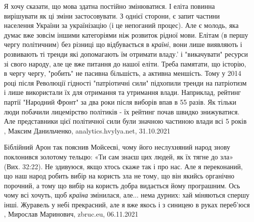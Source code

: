 Я хочу сказати, що мова здатна постійно змінюватися. І еліта повинна вирішувати
як ці зміни застосовувати. З однієї сторони, є запит частини населення України
за українізацію (і це непоганий процес). Але є молодь, яка думає вже зовсім
іншими категоріями ніж розвиток рідної мови. Елітам (в першу чергу політичним)
без різниці що відбувається в \emph{країні}, вони лише виявляють і розвивають ті
тренди які допомагають їм отримати владу.' і "викачувати" ресурси зі свого
народу, але це вже питання до нашої еліти. Треба памятати, що історію, в чергу
чергу, "робить" не пасивна більшість, а активна меншість. Тому у 2014 році
після Революції гідності "патріотичні сили" підхопили тренди на патріотизм і
лише використали їх для отримання та утримання влади. Наприклад, рейтинг партії
"Народний Фронт" за два роки після виборів впав в 55 разів. Як тільки люди
побачили лицемірство політиків - їх рейтинг почав швидко знижуватися. Але
представники цієї політичної сили були значною частиною влади всі 5 років
, 
Максим Данильченко, analytics.hvylya.net, 31.10.2021

Біблійний Арон так пояснив Мойсеєві, чому його неслухняний народ знову
поклонився золотому тельцю: «Ти сам знаєш цих людей, як їх тягне до зла» (Вих.
32:22). Не здивуюся, якщо хтось скаже так і про нас. Але я переконаний, що наш
народ робить вибір на користь зла не тому, що він якийсь органічно порочний, а
тому що вибір на користь добра видається йому програшним. Ось чому всі хочуть,
щоб \emph{країна} змінилася, але... нема дурних: хай міняються спершу інші. Журавель у
небі прекрасний, але я вже якось і з синицею в руках переб’юся
, 
Мирослав Маринович, zbruc.eu, 06.11.2021
